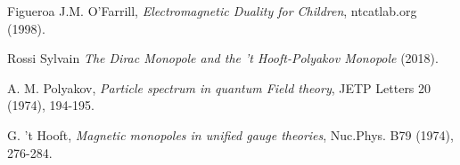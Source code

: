 \documentclass[main.tex]{subfiles}
\begin{document}
\clearpage
{}
{}


\begin{thebibliography}{99}

Figueroa J.M. O'Farrill, \emph{Electromagnetic Duality for Children}, ntcatlab.org
(1998).

Rossi Sylvain \emph{The Dirac Monopole and the 't Hooft-Polyakov Monopole}  (2018).

A. M. Polyakov, \emph{Particle spectrum in quantum Field theory}, JETP Letters 20 (1974), 194-195.

G. 't Hooft, \emph{Magnetic monopoles in unified gauge theories}, Nuc.Phys. B79 (1974), 276-284.


\end{thebibliography}
\end{document}
